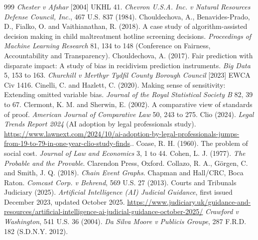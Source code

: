 \begin{thebibliography}{999}
 \emph{Chester v Afshar} [2004] UKHL 41.
 \emph{Chevron U.S.A. Inc. v Natural Resources Defense Council, Inc.}, 467 U.S. 837 (1984).
 Chouldechova, A., Benavides-Prado, D., Fialko, O. and Vaithianathan, R. (2018). A case study of algorithm-assisted decision making in child maltreatment hotline screening decisions. \emph{Proceedings of Machine Learning Research} 81, 134 to 148 (Conference on Fairness, Accountability and Transparency).
 Chouldechova, A. (2017). Fair prediction with disparate impact: A study of bias in recidivism prediction instruments. \emph{Big Data} 5, 153 to 163.
 \emph{Churchill v Merthyr Tydfil County Borough Council} [2023] EWCA Civ 1416.
 Cinelli, C. and Hazlett, C. (2020). Making sense of sensitivity: Extending omitted variable bias. \emph{Journal of the Royal Statistical Society B} 82, 39 to 67.
 Clermont, K. M. and Sherwin, E. (2002). A comparative view of standards of proof. \emph{American Journal of Comparative Law} 50, 243 to 275.
 Clio (2024). \emph{Legal Trends Report 2024} (AI adoption by legal professionals study). \url{https://www.lawnext.com/2024/10/ai-adoption-by-legal-professionals-jumps-from-19-to-79-in-one-year-clio-study-finds}..
 Coase, R. H. (1960). The problem of social cost. \emph{Journal of Law and Economics} 3, 1 to 44.
 Cohen, L. J. (1977). \emph{The Probable and the Provable}. Clarendon Press, Oxford.
 Collazo, R. A., G\"orgen, C. and Smith, J. Q. (2018). \emph{Chain Event Graphs}. Chapman and Hall/CRC, Boca Raton.
 \emph{Comcast Corp. v Behrend}, 569 U.S. 27 (2013).
 Courts and Tribunals Judiciary (2025). \emph{Artificial Intelligence (AI) Judicial Guidance}, first issued December 2023, updated October 2025. \url{https://www.judiciary.uk/guidance-and-resources/artificial-intelligence-ai-judicial-guidance-october-2025/}
 \emph{Crawford v Washington}, 541 U.S. 36 (2004).
 \emph{Da Silva Moore v Publicis Groupe}, 287 F.R.D. 182 (S.D.N.Y. 2012).

\end{thebibliography}
